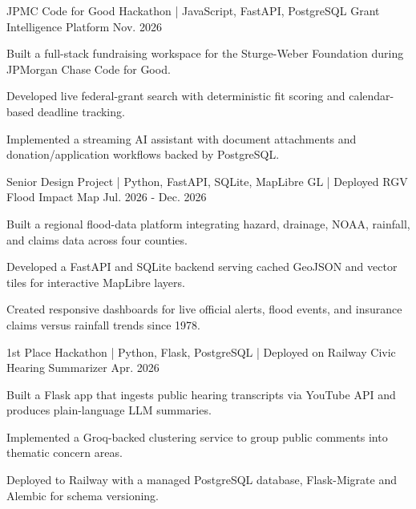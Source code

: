 

\begin{cventries}

  \cventry
    {JPMC Code for Good Hackathon | JavaScript, FastAPI, PostgreSQL} %
    {Grant Intelligence Platform} %
    {} %
    {Nov. 2026} %
    {
      \begin{cvitems}
        \item {Built a full-stack fundraising workspace for the Sturge-Weber Foundation during JPMorgan Chase Code for Good.}
        \item {Developed live federal-grant search with deterministic fit scoring and calendar-based deadline tracking.}
        \item {Implemented a streaming AI assistant with document attachments and donation/application workflows backed by PostgreSQL.}
      \end{cvitems}
    }

  \cventry
    {Senior Design Project | Python, FastAPI, SQLite, MapLibre GL | Deployed} %
    {RGV Flood Impact Map} %
    {} %
    {Jul. 2026 - Dec. 2026} %
    {
      \begin{cvitems}
        \item {Built a regional flood-data platform integrating hazard, drainage, NOAA, rainfall, and claims data across four counties.}
        \item {Developed a FastAPI and SQLite backend serving cached GeoJSON and vector tiles for interactive MapLibre layers.}
        \item {Created responsive dashboards for live official alerts, flood events, and insurance claims versus rainfall trends since 1978.}
      \end{cvitems}
    }

  \cventry
    {1st Place Hackathon | Python, Flask, PostgreSQL | Deployed on Railway} %
    {Civic Hearing Summarizer} %
    {} %
    {Apr. 2026} %
    {
      \begin{cvitems}
        \item {Built a Flask app that ingests public hearing transcripts via YouTube API and produces plain-language LLM summaries.}
        \item {Implemented a Groq-backed clustering service to group public comments into thematic concern areas.}
        \item {Deployed to Railway with a managed PostgreSQL database, Flask-Migrate and Alembic for schema versioning.}
      \end{cvitems}
    }


\end{cventries}
